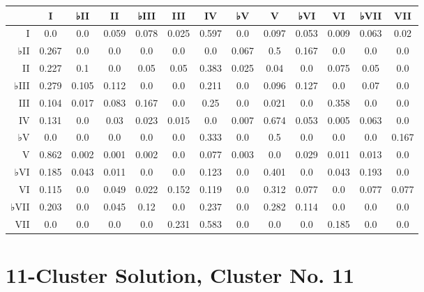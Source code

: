 \begin{table}[htbp]
\begin{minipage}{\linewidth}
\setlength{\tymax}{0.5\linewidth}
\centering
\small
\begin{tabulary}{\textwidth}{@{}RCCCCCCCCCCCC@{}} \toprule
&I&♭II&II&♭III&III&IV&♭V&V&♭VI&VI&♭VII&VII\\
\midrule
I&0.0&0.0&0.059&0.078&0.025&0.597&0.0&0.097&0.053&0.009&0.063&0.02\\
♭II&0.267&0.0&0.0&0.0&0.0&0.0&0.067&0.5&0.167&0.0&0.0&0.0\\
II&0.227&0.1&0.0&0.05&0.05&0.383&0.025&0.04&0.0&0.075&0.05&0.0\\
♭III&0.279&0.105&0.112&0.0&0.0&0.211&0.0&0.096&0.127&0.0&0.07&0.0\\
III&0.104&0.017&0.083&0.167&0.0&0.25&0.0&0.021&0.0&0.358&0.0&0.0\\
IV&0.131&0.0&0.03&0.023&0.015&0.0&0.007&0.674&0.053&0.005&0.063&0.0\\
♭V&0.0&0.0&0.0&0.0&0.0&0.333&0.0&0.5&0.0&0.0&0.0&0.167\\
V&0.862&0.002&0.001&0.002&0.0&0.077&0.003&0.0&0.029&0.011&0.013&0.0\\
♭VI&0.185&0.043&0.011&0.0&0.0&0.123&0.0&0.401&0.0&0.043&0.193&0.0\\
VI&0.115&0.0&0.049&0.022&0.152&0.119&0.0&0.312&0.077&0.0&0.077&0.077\\
♭VII&0.203&0.0&0.045&0.12&0.0&0.237&0.0&0.282&0.114&0.0&0.0&0.0\\
VII&0.0&0.0&0.0&0.0&0.231&0.583&0.0&0.0&0.0&0.185&0.0&0.0\\

\bottomrule

\end{tabulary}
\end{minipage}
\end{table}

\section{11-Cluster Solution, Cluster No. 11}
\label{11-clustersolutionclusterno.11}

